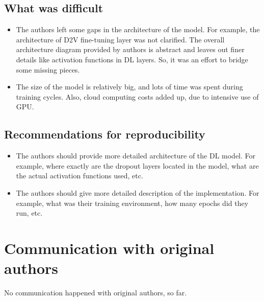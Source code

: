\documentclass[11pt,a4paper]{article}
\begin{document}
\subsection{What was difficult}
\begin{itemize}
	\item The authors left some gaps in the architecture of the model. For example, the architecture of D2V fine-tuning layer was not clarified. The overall architecture diagram provided by authors is abstract and leaves out finer details like activation functions in DL layers. So, it was an effort to bridge some missing pieces.
	\item The size of the model is relatively big, and lots of time was spent during training cycles. Also, cloud computing costs added up, due to intensive use of GPU.
\end{itemize}

\subsection{Recommendations for reproducibility}
\begin{itemize}
	\item The authors should provide more detailed architecture of the DL model. For example, where exactly are the dropout layers located in the model, what are the actual activation functions used, etc.
	\item The authors should give more detailed description of the implementation. For example, what was their training environment, how many epochs did they run, etc.
\end{itemize}


\section{Communication with original authors}

No communication happened with original authors, so far.





\end{document}
